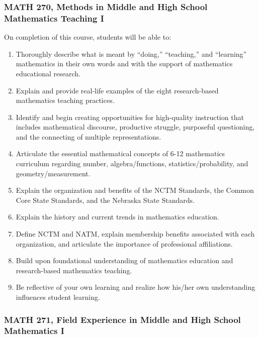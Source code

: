 \documentclass[11pt]{article}
\newenvironment{alphalist}{
\begin{enumerate}[label=(\arabic*),widest=107 ,leftmargin=25pt, itemsep=0pt]}
{\end{enumerate}}
\begin{document}
\subsubsection*{MATH 270, Methods in Middle and High School Mathematics Teaching I}

On completion of this course, students will be able to:
\begin{alphalist}

\item Thoroughly describe what is meant by “doing,”  “teaching,”  and “learning” mathematics in their own words and with the support of mathematics educational research.
\item Explain and provide real-life examples of the eight research-based mathematics teaching practices.
\item Identify and begin creating opportunities for high-quality instruction that includes mathematical 
discourse, productive struggle, purposeful questioning, and the connecting of multiple representations. 
\item Articulate the essential mathematical concepts of 6-12 mathematics curriculum regarding number, algebra/functions, statistics/probability, and geometry/measurement.
\item Explain the organization and benefits of the NCTM Standards, the Common Core State Standards, and the Nebraska State Standards.
\item Explain the history and current trends in mathematics education.
\item Define NCTM and NATM, explain membership benefits associated with each organization, and articulate the importance of professional affiliations.
\item Build upon foundational understanding of mathematics education and research-based mathematics teaching.
\item Be reflective of your own learning and realize how his/her own understanding influences student learning.
\end{alphalist}

\subsubsection*{MATH 271, Field Experience in Middle and High School Mathematics I}
\end{document}
